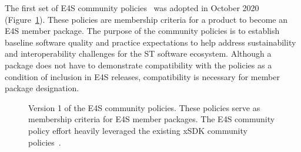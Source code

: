 The first set of E4S community policies~\cite{e4s:policies} was adopted in October 2020 (Figure~\ref{fig:E4S-Community-Policies-V1}). These policies are membership criteria for a product to become an E4S member package. The purpose of the community policies is to establish baseline software quality and practice expectations to help address sustainability and interoperability challenges for the ST software ecosystem. Although a package does not have to demonstrate compatibility with the policies as a condition of inclusion in E4S releases, compatibility is necessary for member package designation.

\begin{figure}
        \centering
        \caption{Version 1 of the E4S community policies. These policies serve as membership criteria for E4S member packages. The E4S community policy effort heavily leveraged the existing xSDK community policies~\cite{xsdk-policies:homepage}.}
          \protect{}
        \label{fig:E4S-Community-Policies-V1}
\end{figure}

